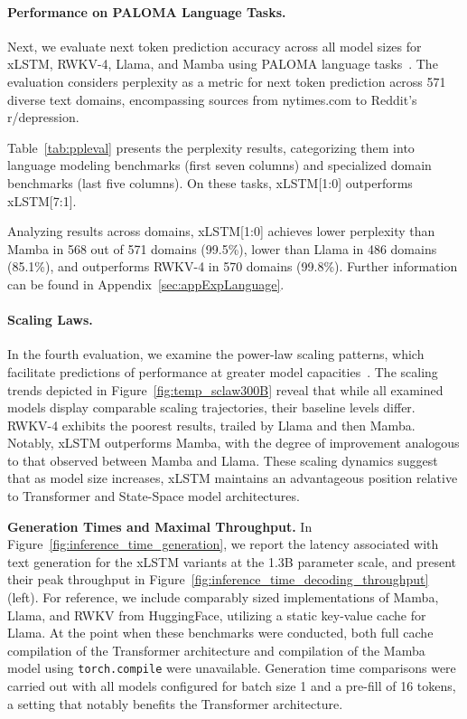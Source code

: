 \paragraph{Performance on PALOMA Language Tasks.} Next, we evaluate next token prediction accuracy across all model sizes for xLSTM, RWKV-4, Llama, and Mamba using PALOMA language tasks~\citep{Magnusson:23arxivshort}. The evaluation considers perplexity as a metric for next token prediction across 571 diverse text domains, encompassing sources from nytimes.com to Reddit’s r/depression. 

Table~\ref{tab:ppleval} presents the perplexity results, categorizing them into language modeling benchmarks (first seven columns) and specialized domain benchmarks (last five columns). On these tasks, xLSTM[1:0] outperforms xLSTM[7:1].

Analyzing results across domains, xLSTM[1:0] achieves lower perplexity than Mamba in 568 out of 571 domains (99.5\%), lower than Llama in 486 domains (85.1\%), and outperforms RWKV-4 in 570 domains (99.8\%). Further information can be found in Appendix~\ref{sec:appExpLanguage}.

\paragraph{Scaling Laws.} In the fourth evaluation, we examine the power-law scaling patterns, which facilitate predictions of performance at greater model capacities~\citep{Kaplan:20,Brown:20short}. The scaling trends depicted in Figure~\ref{fig:temp_sclaw300B} reveal that while all examined models display comparable scaling trajectories, their baseline levels differ. RWKV-4 exhibits the poorest results, trailed by Llama and then Mamba. Notably, xLSTM outperforms Mamba, with the degree of improvement analogous to that observed between Mamba and Llama. These scaling dynamics suggest that as model size increases, xLSTM maintains an advantageous position relative to Transformer and State-Space model architectures.

\textbf{Generation Times and Maximal Throughput.} In Figure~\ref{fig:inference_time_generation}, we report the latency associated with text generation for the xLSTM variants at the 1.3B parameter scale, and present their peak throughput in Figure~\ref{fig:inference_time_decoding_throughput} (left). For reference, we include comparably sized implementations of Mamba, Llama, and RWKV from HuggingFace, utilizing a static key-value cache for Llama. At the point when these benchmarks were conducted, both full cache compilation of the Transformer architecture and compilation of the Mamba model using \texttt{torch.compile} were unavailable. Generation time comparisons were carried out with all models configured for batch size 1 and a pre-fill of 16 tokens, a setting that notably benefits the Transformer architecture.


